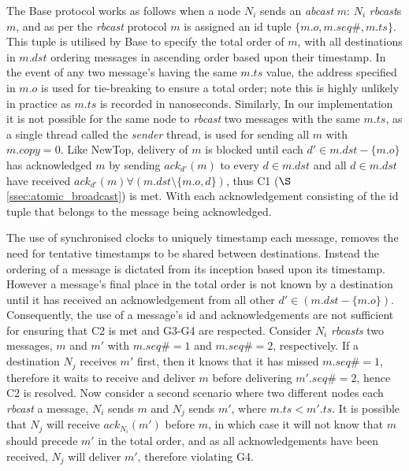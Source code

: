     The \textsf{Base} protocol works as follows when a node $N_i$ sends an \emph{abcast} $m$: $N_i$ \emph{rbcast}s $m$, and as per the \emph{rbcast} protocol $m$ is assigned an id tuple $\{m.o, m.seq\#, m.ts\}$.  This tuple is utilised by \textsf{Base} to specify the total order of $m$, with all destinations in $m.dst$ ordering messages in ascending order based upon their timestamp.  In the event of any two message's having the same $m.ts$ value, the address specified in $m.o$ is used for tie-breaking to ensure a total order; note this is highly unlikely in practice as $m.ts$ is recorded in nanoseconds.  Similarly, In our implementation it is not possible for the same node to \emph{rbcast} two messages with the same $m.ts$, as a single thread called the \emph{sender} thread, is used for sending all $m$ with $m.copy = 0$.  Like NewTop, delivery of $m$ is blocked until each $d' \in m.dst - \{m.o\}$ has acknowledged $m$ by sending $ack_{d'}(m)$ to every $d \in m.dst$ and all $d \in m.dst$ have received $ack_{d'}(m) \forall (m.dst \setminus \{m.o,d\})$, thus C1 ($\S$ \ref{ssec:atomic_broadcast}) is met.  With each acknowledgement consisting of the id tuple that belongs to the message being acknowledged.  
    
    The use of synchronised clocks to uniquely timestamp each message, removes the need for tentative timestamps to be shared between destinations.  Instead the ordering of a message is dictated from its inception based upon its timestamp.  However a message's final place in the total order is not known by a destination until it has received an acknowledgement from all other $d' \in (m.dst - \{m.o\})$.  Consequently, the use of a message's id and acknowledgements are not sufficient for ensuring that C2 is met and G3-G4 are respected.  Consider $N_i$ \emph{rbcasts} two messages, $m$ and $m'$ with $m.seq\# = 1$ and $m.seq\# = 2$, respectively.  If a destination $N_j$ receives $m'$ first, then it knows that it has missed $m.seq\# = 1$, therefore it waits to receive and deliver $m$ before delivering $m'.seq\# = 2$, hence C2 is resolved.  Now consider a second scenario where two different nodes each \emph{rbcast} a message, $N_i$ sends $m$ and $N_j$ sends $m'$, where $m.ts < m'.ts$.  It is possible that $N_j$ will receive $ack_{N_i}(m')$ before $m$, in which case it will not know that $m$ should precede $m'$ in the total order, and as all acknowledgements have been received, $N_j$ will deliver $m'$, therefore violating G4.  
    
